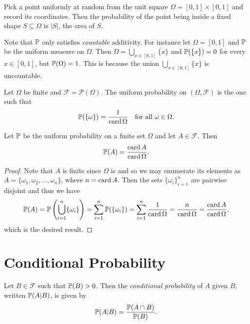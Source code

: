 \begin{example}
  Pick a point uniformly at random from the
  unit square $\Omega = [0, 1] \times [0, 1]$
  and record its coordinates. Then the probability 
  of the point being inside a fixed shape
  $S \subseteq \Omega$ is $|S|$, the area of $S$.
\end{example}

\begin{remark}
  Note that $\mathbb{P}$ only satisfies
  \emph{countable} additivity. For instance let
  $\Omega = [0, 1]$ and $\mathbb{P}$ be the uniform
  measure on $\Omega$. Then $\Omega = \bigcup_{x \in [0, 1]} \{x\}$
  and $\mathbb{P}(\{x\}) = 0$ for every $x \in [0, 1]$,
    but $\mathbb{P}(\Omega) = 1$.
    This is because the union
    $\bigcup_{x \in [0, 1]} \{x\}$ is uncountable.
\end{remark}

\begin{definition}
  Let $\Omega$ be finite and
  $\mathcal{F} = \mathcal{P}(\Omega)$. The uniform
  probability on $(\Omega, \mathcal{F})$
  is the one such that
  \[
    \mathbb{P}(\{\omega\}) = \frac{1}{\operatorname{card} \Omega}
    \quad \text{for all $\omega \in \Omega$.}
  \]
\end{definition}

\begin{prop}
  Let $\mathbb{P}$ be the uniform probability
  on a finite set $\Omega$ and let $A \in \mathcal{F}$.
  Then
  \[
    \mathbb{P}(A) = \frac{\operatorname{card} A}{\operatorname{card} \Omega}.
  \]
\end{prop}

\begin{proof}
  Note that $A$ is finite since $\Omega$ is and
  so we may enumerate its elements
  as $A = \{\omega_1, \omega_2, \dots, \omega_n\}$,
  where $n = \operatorname{card} A$.
  Then the sets $\{\omega_i\}_{i = 1}^n$ are pairwise disjoint
  and thus we have
  \[
    \mathbb{P}(A) = \mathbb{P}\left(\bigcup_{i = 1}^n \{\omega_i\}\right)
    = \sum_{i = 1}^n \mathbb{P}(\{\omega_i\})
    = \sum_{i = 1}^n \frac{1}{\operatorname{card} \Omega}
    = \frac{n}{\operatorname{card} \Omega}
    = \frac{\operatorname{card} A}{\operatorname{card} \Omega},
  \]
  which is the desired result.
\end{proof}

\section{Conditional Probability}
\begin{definition}
  Let $B \in \mathcal{F}$ such that
  $\mathbb{P}(B) > 0$. Then the \emph{conditional probability}
  of $A$ given $B$, written $\mathbb{P}(A | B)$, is given by
  \[
    \mathbb{P}(A | B) = \frac{\mathbb{P}(A \cap B)}{\mathbb{P}(B)}.
  \]
\end{definition}

